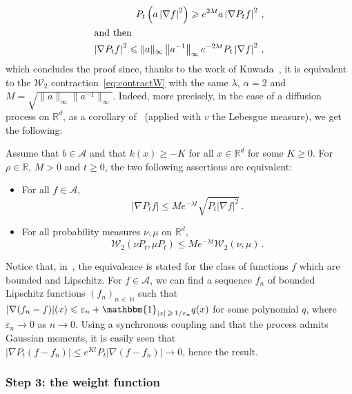 \documentclass[10pt]{amsart}
\theoremstyle{definition}\newtheorem{defi}[theo]{Definition}\newtheorem{rema}[theo]{Remark}\newtheorem{exam}[theo]{Example}\newtheorem{exem}[theo]{Example}\newtheorem{nota}[theo]{Notation}
\newcommand{\R}{\mathbb R}
\newcommand{\A}{\mathcal A}
\newcommand{\clW}{\mathcal W}
\newcommand{\N}{\mathbb N}
\newcommand{\na}{\nabla}
\newcommand{\1}{\mathbbm{1}}
\begin{document}
\begin{align*}
P_t\left( a\left|\na f\right|^2\right) \geqslant e^{2\lambda t} a \left|\na P_t f\right|^2\,,
\\
\intertext{and then}
\left|\na P_t f\right|^2 \leqslant \|a\|_\infty \left\| a^{-1}\right\|_\infty e^{-2\lambda t} P_t\left|\na f\right|^2\,,
\end{align*}
which concludes the proof since, thanks to the work of Kuwada~\cite{Kuwada1,Kuwada2}, it is equivalent to the $\clW_2$ contraction~\eqref{eq:contractW} with the same $\lambda$, $\alpha=2$ and $M = \sqrt{\|a\|_\infty \| a^{-1}\|_\infty }$. Indeed, more precisely, in the case of a diffusion process on $\R^d$, as a corollary of~\cite[Theorem~2.2]{Kuwada1} (applied with $v$ the Lebesgue measure), we get the following:

\begin{prop}\label{prop:kuwada}
Assume that $b\in \A$ and that $k(x) \geqslant - K$ for all $x\in\R^d$ for some $K\geqslant 0$. For $\rho\in\R$, $M>0$ and $t\geqslant 0$, the two following assertions are equivalent:
\begin{itemize}
\item For all $f\in\A$,
\[
\left|\na P_t f\right| \leqslant M e^{-\lambda t} \sqrt{P_t\left|\na f\right|^2}\,.
\]
\item For all probability measures $\nu,\mu$ on $\R^d$,
\[
\clW_2\left(\nu P_t,\mu P_t\right) \leqslant M e^{-\lambda t} \clW_2(\nu,\mu)\,.
\]
\end{itemize}
\end{prop}

Notice that, in~\cite[Theorem~2.2]{Kuwada1}, the equivalence is stated for the class of functions $f$ which are bounded and Lipschitz. For $f\in\A$, we can find a sequence $f_n$ of bounded Lipschitz functions $(f_n)_{n\,\in\,\N}$ such that $|\na (f_n - f)|(x) \leqslant \varepsilon_n + \1_{|x|\,\geqslant\,1/\varepsilon_n} q(x)$ for some polynomial $q$, where $\varepsilon_n \rightarrow 0$ as $n\rightarrow 0$. Using a synchronous coupling and that the process admits Gaussian moments, it is easily seen that $|\na P_t (f-f_n)| \leqslant e^{Kt} P_t|\na (f-f_n)| \rightarrow 0 $, hence the result.

\subsubsection{Step 3: the weight function}
\end{document}
